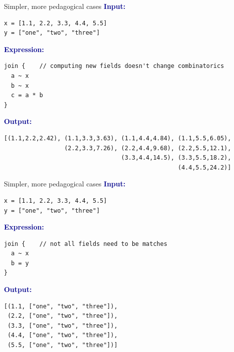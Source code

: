 \documentclass[aspectratio=169]{beamer}
\begin{document}
\begin{frame}[fragile]{Simpler, more pedagogical cases}
\vspace{0.25 cm}
\textcolor{darkblue}{\large\bf Input:}

\begin{verbatim}
x = [1.1, 2.2, 3.3, 4.4, 5.5]
y = ["one", "two", "three"]
\end{verbatim}

\vspace{0.25 cm}
\textcolor{darkblue}{\large\bf Expression:}

\begin{verbatim}
join {    // computing new fields doesn't change combinatorics
  a ~ x
  b ~ x
  c = a * b
}
\end{verbatim}

\vspace{0.25 cm}
\textcolor{darkblue}{\large\bf Output:}

\begin{verbatim}
[(1.1,2.2,2.42), (1.1,3.3,3.63), (1.1,4.4,4.84), (1.1,5.5,6.05),
                 (2.2,3.3,7.26), (2.2,4.4,9.68), (2.2,5.5,12.1),
                                 (3.3,4.4,14.5), (3.3,5.5,18.2),
                                                 (4.4,5.5,24.2)]

\end{verbatim}
\end{frame}

\begin{frame}[fragile]{Simpler, more pedagogical cases}
\vspace{0.25 cm}
\textcolor{darkblue}{\large\bf Input:}

\begin{verbatim}
x = [1.1, 2.2, 3.3, 4.4, 5.5]
y = ["one", "two", "three"]
\end{verbatim}

\vspace{0.25 cm}
\textcolor{darkblue}{\large\bf Expression:}

\begin{verbatim}
join {    // not all fields need to be matches
  a ~ x
  b = y
}
\end{verbatim}

\vspace{0.25 cm}
\textcolor{darkblue}{\large\bf Output:}

\begin{verbatim}
[(1.1, ["one", "two", "three"]),
 (2.2, ["one", "two", "three"]),
 (3.3, ["one", "two", "three"]),
 (4.4, ["one", "two", "three"]),
 (5.5, ["one", "two", "three"])]
\end{verbatim}
\end{frame}
\end{document}
